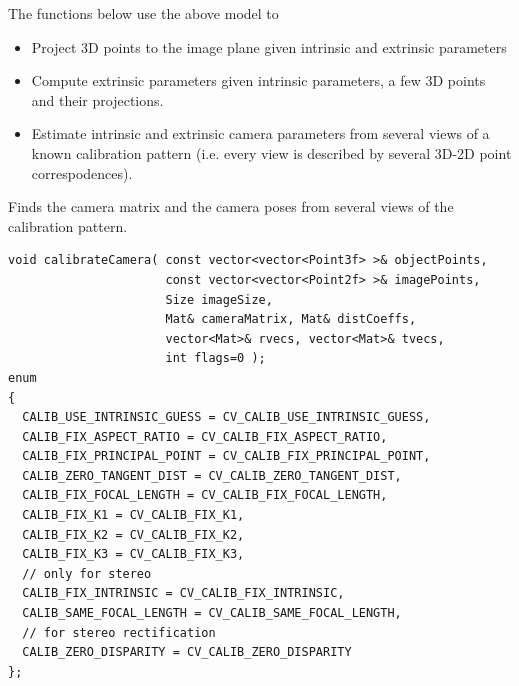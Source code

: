 \begin{description}
The functions below use the above model to

\begin{itemize}
 \item Project 3D points to the image plane given intrinsic and extrinsic parameters
 \item Compute extrinsic parameters given intrinsic parameters, a few 3D points and their projections.
 \item Estimate intrinsic and extrinsic camera parameters from several views of a known calibration pattern (i.e. every view is described by several 3D-2D point correspodences).
\end{itemize}


\label{calibrateCamera}
Finds the camera matrix and the camera poses from several views of the calibration pattern.

\begin{lstlisting}
void calibrateCamera( const vector<vector<Point3f> >& objectPoints,
                      const vector<vector<Point2f> >& imagePoints,
                      Size imageSize,
                      Mat& cameraMatrix, Mat& distCoeffs,
                      vector<Mat>& rvecs, vector<Mat>& tvecs,
                      int flags=0 );
enum
{
  CALIB_USE_INTRINSIC_GUESS = CV_CALIB_USE_INTRINSIC_GUESS,
  CALIB_FIX_ASPECT_RATIO = CV_CALIB_FIX_ASPECT_RATIO,
  CALIB_FIX_PRINCIPAL_POINT = CV_CALIB_FIX_PRINCIPAL_POINT,
  CALIB_ZERO_TANGENT_DIST = CV_CALIB_ZERO_TANGENT_DIST,
  CALIB_FIX_FOCAL_LENGTH = CV_CALIB_FIX_FOCAL_LENGTH,
  CALIB_FIX_K1 = CV_CALIB_FIX_K1,
  CALIB_FIX_K2 = CV_CALIB_FIX_K2,
  CALIB_FIX_K3 = CV_CALIB_FIX_K3,
  // only for stereo
  CALIB_FIX_INTRINSIC = CV_CALIB_FIX_INTRINSIC,
  CALIB_SAME_FOCAL_LENGTH = CV_CALIB_SAME_FOCAL_LENGTH,
  // for stereo rectification
  CALIB_ZERO_DISPARITY = CV_CALIB_ZERO_DISPARITY
};
\end{lstlisting}


\end{description}
